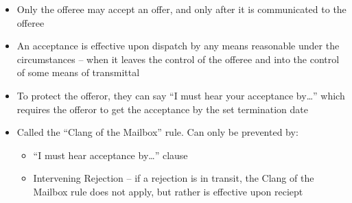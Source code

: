 \documentclass{article}
\begin{document}
\begin{itemize}
		\begin{itemize}
			\item Only the offeree may accept an offer, and only after it is communicated to the offeree
			\item An acceptance is effective upon dispatch by any means reasonable under the circumstances -- when it leaves the control of the offeree and into the control of some means of transmittal
			\item To protect the offeror, they can say ``I must hear your acceptance by\dots'' which requires the offeror to get the acceptance by the set termination date
			\item Called the ``Clang of the Mailbox'' rule. Can only be prevented by:
			\begin{itemize}
				\item ``I must hear acceptance by\dots'' clause
				\item Intervening Rejection -- if a rejection is in transit, the Clang of the Mailbox rule does not apply, but rather is effective upon reciept
			\end{itemize}
		\end{itemize}
	\end{itemize}
\end{document}
